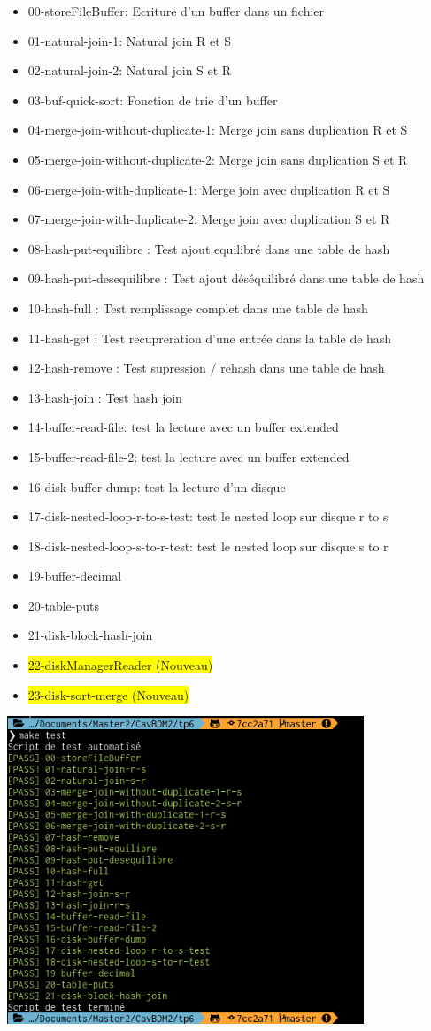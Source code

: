 \documentclass[a4paper]{article}
\begin{document}
\begin{itemize}
  \item 00-storeFileBuffer: Ecriture d'un buffer dans un fichier
  \item 01-natural-join-1: Natural join R et S
  \item 02-natural-join-2: Natural join S et R
  \item 03-buf-quick-sort: Fonction de trie d'un buffer
  \item 04-merge-join-without-duplicate-1: Merge join sans duplication R et S
  \item 05-merge-join-without-duplicate-2: Merge join sans duplication S et R
  \item 06-merge-join-with-duplicate-1: Merge join avec duplication R et S
  \item 07-merge-join-with-duplicate-2: Merge join avec duplication S et R
  \item 08-hash-put-equilibre : Test ajout equilibré dans une table de hash
  \item 09-hash-put-desequilibre : Test ajout déséquilibré dans une table de hash
  \item 10-hash-full : Test remplissage complet dans une table de hash
  \item 11-hash-get : Test recupreration d'une entrée dans la table de hash
  \item 12-hash-remove : Test supression / rehash dans une table de hash
  \item 13-hash-join : Test hash join
  \item 14-buffer-read-file: test la lecture avec un buffer extended
  \item 15-buffer-read-file-2: test la lecture avec un buffer extended
  \item 16-disk-buffer-dump: test la lecture d'un disque
  \item 17-disk-nested-loop-r-to-s-test: test le nested loop sur disque r to s
  \item 18-disk-nested-loop-s-to-r-test: test le nested loop sur disque s to r
  \item 19-buffer-decimal
  \item 20-table-puts
  \item 21-disk-block-hash-join
  \item \colorbox{yellow}{22-diskManagerReader (Nouveau)}
  \item \colorbox{yellow}{23-disk-sort-merge (Nouveau)}
\end{itemize}

\includegraphics[width=0.8\textwidth]{test.png}
\end{document}
